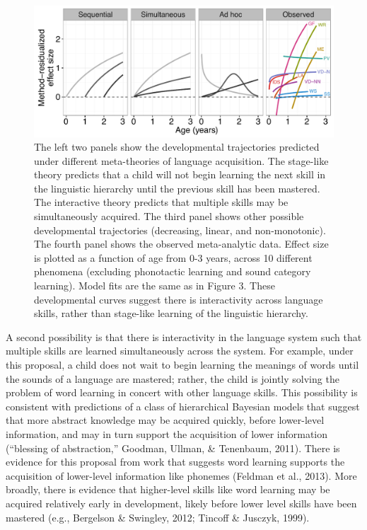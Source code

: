 \documentclass[9pt,twocolumn,twoside,lineno]{pnas-new}
\begin{document}
\begin{figure}[htbp]
\centering
\includegraphics[width=17.8cm]{figs/fig4_lab.pdf}
\caption{The left two panels show the developmental trajectories
predicted under different meta-theories of language acquisition. The
stage-like theory predicts that a child will not begin learning the next
skill in the linguistic hierarchy until the previous skill has been
mastered. The interactive theory predicts that multiple skills may be
simultaneously acquired. The third panel shows other possible
developmental trajectories (decreasing, linear, and non-monotonic). The
fourth panel shows the observed meta-analytic data. Effect size is
plotted as a function of age from 0-3 years, across 10 different
phenomena (excluding phonotactic learning and sound category learning).
Model fits are the same as in Figure 3. These developmental curves
suggest there is interactivity across language skills, rather than
stage-like learning of the linguistic hierarchy.}
\end{figure}

A second possibility is that there is interactivity in the language
system such that multiple skills are learned simultaneously across the
system. For example, under this proposal, a child does not wait to begin
learning the meanings of words until the sounds of a language are
mastered; rather, the child is jointly solving the problem of word
learning in concert with other language skills. This possibility is
consistent with predictions of a class of hierarchical Bayesian models
that suggest that more abstract knowledge may be acquired quickly,
before lower-level information, and may in turn support the acquisition
of lower information (``blessing of abstraction,'' Goodman, Ullman, \&
Tenenbaum, 2011). There is evidence for this proposal from work that
suggests word learning supports the acquisition of lower-level
information like phonemes (Feldman et al., 2013). More broadly, there is
evidence that higher-level skills like word learning may be acquired
relatively early in development, likely before lower level skills have
been mastered (e.g., Bergelson \& Swingley, 2012; Tincoff \& Jusczyk,
1999).
\end{document}
